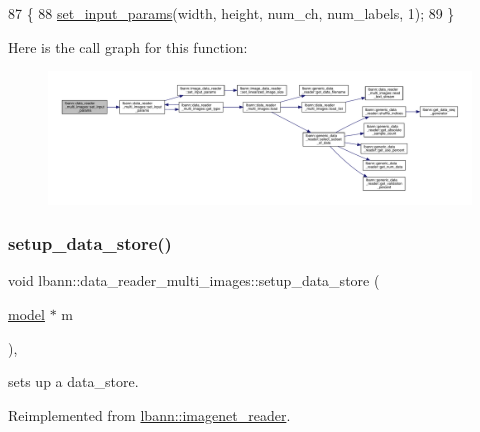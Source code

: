 \begin{DoxyCode}
87                                                                                                            
                    \{
88   \hyperlink{classlbann_1_1data__reader__multi__images_a57824ec9de5c1131b2f15a0cb3d4ab75}{set\_input\_params}(width, height, num\_ch, num\_labels, 1);
89 \}
\end{DoxyCode}
Here is the call graph for this function\+:\nopagebreak
\begin{figure}[H]
\begin{center}
\leavevmode
\includegraphics[width=350pt]{classlbann_1_1data__reader__multi__images_afdb403556ed04a9142932e89ac60435e_cgraph}
\end{center}
\end{figure}
\mbox{\label{classlbann_1_1data__reader__multi__images_ac4c70724fe5f1378a81394cc2e686297}} 
\subsubsection{\texorpdfstring{setup\+\_\+data\+\_\+store()}{setup\_data\_store()}}
{\footnotesize\ttfamily void lbann\+::data\+\_\+reader\+\_\+multi\+\_\+images\+::setup\+\_\+data\+\_\+store (\begin{DoxyParamCaption}\item[{\hyperlink{classlbann_1_1model}{model} $\ast$}]{m }\end{DoxyParamCaption})\hspace{0.3cm}{\ttfamily [override]}, {\ttfamily [virtual]}}



sets up a data\+\_\+store. 



Reimplemented from \hyperlink{classlbann_1_1imagenet__reader_a17af38eff1c3aee001d263248b8406a1}{lbann\+::imagenet\+\_\+reader}.



